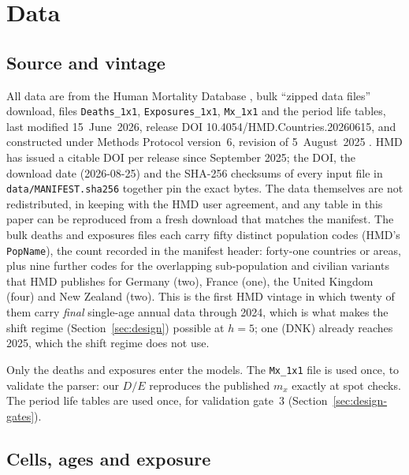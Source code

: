 \section{Data}
\label{sec:data}

\subsection{Source and vintage}

All data are from the Human Mortality Database \citep{hmd2026}, bulk
``zipped data files'' download, files \texttt{Deaths\_1x1},
\texttt{Exposures\_1x1}, \texttt{Mx\_1x1} and the period life tables, last
modified 15~June~2026, release DOI 10.4054/HMD.Countries.20260615, and
constructed under Methods Protocol version~6, revision of 5~August~2025
\citep{wilmoth2025methods}. HMD has issued a citable DOI per release since
September 2025; the DOI, the download date (2026-08-25) and the SHA-256
checksums of every input file in \texttt{data/MANIFEST.sha256} together pin
the exact bytes. The data themselves are not redistributed, in keeping with
the HMD user agreement, and any table in this paper can be reproduced from
a fresh download that matches the manifest. The bulk deaths and exposures
files each carry fifty distinct population codes (HMD's \texttt{PopName}),
the count recorded in the manifest header: forty-one countries or areas,
plus nine further codes for the overlapping sub-population and civilian
variants that HMD publishes for Germany (two), France (one), the United
Kingdom (four) and New Zealand (two). This is the first HMD vintage in which
twenty of them carry \emph{final} single-age annual data through 2024,
which is what makes the shift regime (Section~\ref{sec:design}) possible at
$h=5$; one (DNK) already reaches 2025, which the shift regime does not use.

Only the deaths and exposures enter the models. The \texttt{Mx\_1x1} file is
used once, to validate the parser: our $D/E$ reproduces the published $m_x$
exactly at spot checks. The period life tables are used once, for validation
gate~3 (Section~\ref{sec:design-gates}).

\subsection{Cells, ages and exposure}


